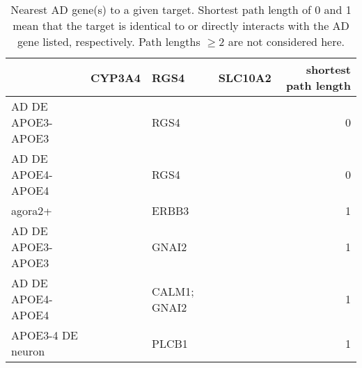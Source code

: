 \documentclass[letterpaper]{article}
\begin{document}
\begin{table}[p]
\begin{tabular}{lrlrr}
\toprule
{} &  CYP3A4 &          RGS4 &  SLC10A2 &  shortest path length \\
\midrule
AD DE APOE3-APOE3 &         &          RGS4 &          &                     0 \\
AD DE APOE4-APOE4 &         &          RGS4 &          &                     0 \\
agora2+           &         &         ERBB3 &          &                     1 \\
AD DE APOE3-APOE3 &         &         GNAI2 &          &                     1 \\
AD DE APOE4-APOE4 &         &  CALM1; GNAI2 &          &                     1 \\
APOE3-4 DE neuron &         &         PLCB1 &          &                     1 \\
\bottomrule
\end{tabular}
\caption{
  Nearest AD gene(s) to a given target.  Shortest path length
  of 0 and 1 mean that the target is identical to or directly interacts with
  the AD gene listed, respectively.  Path lengths $\ge 2$ are not considered
  here.
}
\label{tab:nearest-ADgenes}
\end{table}
\end{document}
